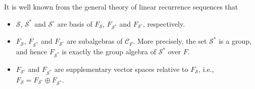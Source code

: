\documentclass[12pt]{amsart}
\theoremstyle{definition}
\numberwithin{equation}{section}
\numberwithin{equation}{section}
\begin{document}
It is well known from the general theory of linear recurrence sequences that
\begin{itemize}
\item $\mathcal{S}$, $\mathcal{S}^{\ast}$ and $\mathcal{S}^{\circ}$ are basis of $F_{\mathcal{S}}$, $F_{\mathcal{S}^{\ast}}$ and $F_{\mathcal{S}^{\circ}}$, respectively.
\item $F_{\mathcal{S}}$, $F_{\mathcal{S}^{\ast}}$ and $F_{\mathcal{S}^{\circ}}$ are subalgebras of $\mathcal{C}_{F}$. More precisely, the set $\mathcal{S}^{\ast}$ is a group, and hence $F_{\mathcal{S}^{\ast}}$ is exactly the group algebra of $\mathcal{S}^{\ast}$ over $F$.
\item $F_{\mathcal{S}^{\circ}}$ and $F_{\mathcal{S}^{\ast}}$ are supplementary vector spaces relative to $F_{\mathcal{S}}$, i.e., $F_{\mathcal{S}}=F_{\mathcal{S}^{\circ}}\oplus F_{\mathcal{S}^{\ast}}$.
\end{itemize}
\end{document}
